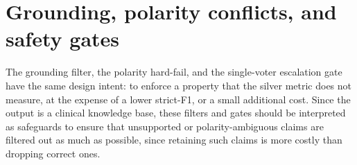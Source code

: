 \section{Grounding, polarity conflicts, and safety gates}\label{section:disc-grounding-polarity-conflicts-and-safety-gates}

The grounding filter, the polarity hard-fail, and the single-voter escalation gate have the same design intent: to enforce a property that the silver metric does not measure, at the expense of a lower strict-F1, or a small additional cost. Since the output is a clinical knowledge base, these filters and gates should be interpreted as safeguards to ensure that unsupported or polarity-ambiguous claims are filtered out as much as possible, since retaining such claims is more costly than dropping correct ones.


